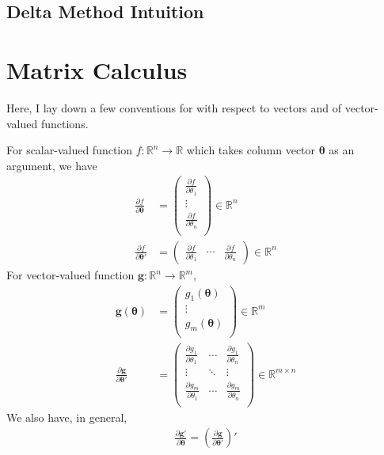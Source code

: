 \documentclass[12pt]{article}
\theoremstyle{plain}
\theoremstyle{definition}
\theoremstyle{remark}
\begin{document}
\subsection{Delta Method Intuition}








\clearpage
\appendix

\section{Matrix Calculus}

Here, I lay down a few conventions for with respect to vectors and of
vector-valued functions.

For scalar-valued function $f: \mathbb{R}^n \rightarrow \mathbb{R}$
which takes column vector $\boldsymbol{\theta}$ as an argument, we have
\begin{align*}
  \frac{\partial f}{\partial \boldsymbol{\theta}}
  &=
  \begin{pmatrix}
    \frac{\partial f}{\partial \theta_1} \\
    \vdots\\
    \frac{\partial f}{\partial \theta_n} \\
    \end{pmatrix} \in \mathbb{R}^n\\
  \frac{\partial f}{\partial \boldsymbol{\theta}'}
  &=
  \begin{pmatrix}
    \frac{\partial f}{\partial \theta_1} &
    \cdots&
    \frac{\partial f}{\partial \theta_n}
  \end{pmatrix}\in \mathbb{R}^n
\end{align*}
For vector-valued function $\boldsymbol{g}:
\mathbb{R}^n\rightarrow\mathbb{R}^m$,
\begin{align*}
  \boldsymbol{g}(\boldsymbol{\theta})
  &=
  \begin{pmatrix}
    g_1(\boldsymbol{\theta}) \\
    \vdots \\
    g_m(\boldsymbol{\theta}) \\
  \end{pmatrix}\in \mathbb{R}^m\\
  \frac{\partial \boldsymbol{g}}{\partial \boldsymbol{\theta'}}
  &=
  \begin{pmatrix}
    \frac{\partial g_1}{\partial \theta_1}
      & \cdots & \frac{\partial g_1}{\partial \theta_n}\\
    \vdots & \ddots & \vdots\\
    \frac{\partial g_m}{\partial \theta_1}
      & \cdots & \frac{\partial g_m}{\partial \theta_n}\\
  \end{pmatrix}
  \in \mathbb{R}^{m\times n}
\end{align*}
We also have, in general,
\begin{align*}
  \frac{\partial\boldsymbol{g'}}{\partial \boldsymbol{\theta}}
  =
  \left(
  \frac{\partial\boldsymbol{g}}{\partial \boldsymbol{\theta'}}
  \right)'
\end{align*}
\end{document}
